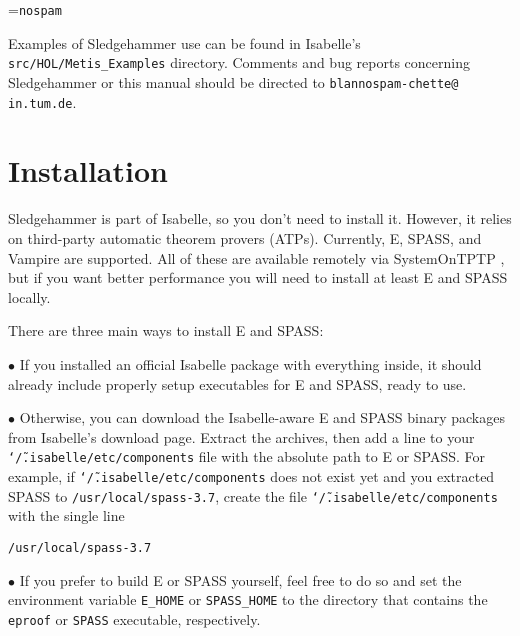 \documentclass[a4paper,12pt]{article}
\begin{document}
\newbox\boxA
\setbox\boxA=\hbox{\texttt{nospam}}

Examples of Sledgehammer use can be found in Isabelle's
\texttt{src/HOL/Metis\_Examples} directory.
Comments and bug reports concerning Sledgehammer or this manual should be
directed to
\texttt{blan{\color{white}nospam}\kern-\wd\boxA{}chette@\allowbreak
in.\allowbreak tum.\allowbreak de}.

\smallskipamount


\section{Installation}
\label{installation}

Sledgehammer is part of Isabelle, so you don't need to install it. However, it
relies on third-party automatic theorem provers (ATPs). Currently, E, SPASS, and
Vampire are supported. All of these are available remotely via SystemOnTPTP
\cite{sutcliffe-2000}, but if you want better performance you will need to
install at least E and SPASS locally.

There are three main ways to install E and SPASS:

\begin{enum}
\item[$\bullet$] If you installed an official Isabelle package with everything
inside, it should already include properly setup executables for E and SPASS,
ready to use.

\item[$\bullet$] Otherwise, you can download the Isabelle-aware E and SPASS
binary packages from Isabelle's download page. Extract the archives, then add a
line to your \texttt{\char`\~/.isabelle/etc/components} file with the absolute path to
E or SPASS. For example, if \texttt{\char`\~/.isabelle/etc/components} does not exist
yet and you extracted SPASS to \texttt{/usr/local/spass-3.7}, create
the file \texttt{\char`\~/.isabelle/etc/components} with the single line

\prew
\texttt{/usr/local/spass-3.7}
\postw

\item[$\bullet$] If you prefer to build E or SPASS yourself, feel free to do so
and set the environment variable \texttt{E\_HOME} or \texttt{SPASS\_HOME} to the
directory that contains the \texttt{eproof} or \texttt{SPASS} executable,
respectively.
\end{enum}
\end{document}
